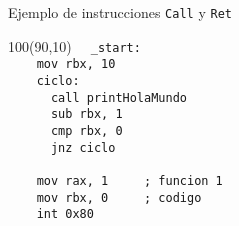 \documentclass[aspectratio=169]{beamer}
\begin{document}
\begin{frame}[fragile]{Ejemplo de instrucciones \texttt{Call} y \texttt{Ret}}
    \begin{textblock}{100}(90,10)
    \scriptsize
    \verb|  _start:                     |\\ 
    \verb|    mov rbx, 10               |\\
    \verb|    ciclo:                    |\\
    \verb|      call printHolaMundo     |\\
    \verb|      sub rbx, 1              |\\
    \verb|      cmp rbx, 0              |\\
    \verb|      jnz ciclo               |\\
    \verb|                              |\\
    \verb|    mov rax, 1     ; funcion 1|\\ 
    \verb|    mov rbx, 0     ; codigo   |\\ 
    \verb|    int 0x80                  |\\
    \end{textblock}

\end{frame}
\end{document}
